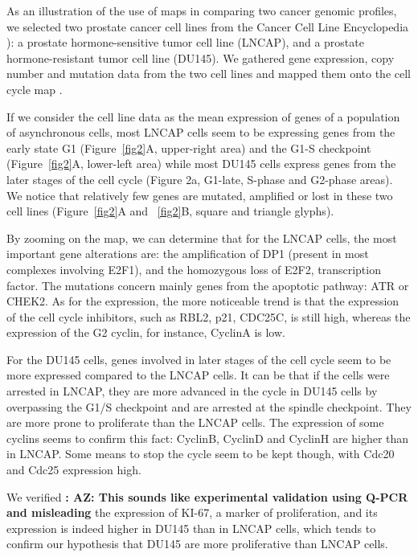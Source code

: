 \documentclass[a4,center,fleqn]{NAR}
\begin{document}
As an illustration of the use of maps in comparing two cancer genomic profiles, we
selected two prostate cancer cell lines from the Cancer Cell Line Encyclopedia
\cite{barretina2012cancer}): a prostate hormone-sensitive
tumor cell line (LNCAP), and a prostate hormone-resistant tumor cell line
(DU145). We gathered gene expression, copy number and mutation data from
the two cell lines and mapped them onto the cell cycle map
\cite{calzone2008comprehensive}.

If we consider the cell line data as the mean expression of genes of a
population of asynchronous cells, most LNCAP cells seem to be expressing genes
from the early state G1 (Figure~\ref{fig2}A, upper-right area) and the G1-S checkpoint
(Figure~\ref{fig2}A, lower-left area) while most DU145 cells express genes from the
later stages of the cell cycle (Figure 2a, G1-late, S-phase and G2-phase
areas).  We notice that relatively few genes are mutated, amplified or lost
in these two cell lines (Figure~\ref{fig2}A and ~\ref{fig2}B, square and triangle glyphs).

By zooming on the map, we can determine that for the LNCAP cells, the most
important gene alterations are: the amplification of DP1 (present in most
complexes involving E2F1), and the homozygous loss of E2F2, transcription
factor. The mutations concern mainly genes from the apoptotic pathway: ATR or
CHEK2. As for the expression, the more noticeable trend is that the expression
of the cell cycle inhibitors, such as RBL2, p21, CDC25C, is still high, whereas
the expression of the G2 cyclin, for instance, CyclinA is low.

For the DU145 cells, genes involved in later stages of the cell cycle seem to
be more expressed compared to the LNCAP cells. It can be that if the cells were
arrested in LNCAP, they are more advanced in the cycle in DU145 cells by
overpassing the G1/S checkpoint and are arrested at the spindle checkpoint.
They are more prone to proliferate than the LNCAP cells. The expression of some
cyclins seems to confirm this fact: CyclinB, CyclinD and CyclinH are higher
than in LNCAP. Some means to stop the cycle seem to be kept though, with Cdc20
and Cdc25 expression high.

We verified {\bf: AZ: This sounds like experimental validation using Q-PCR and misleading} 
the expression of KI-67, a marker of proliferation, and its
expression is indeed higher in DU145 than in LNCAP cells, which tends to
confirm our hypothesis that DU145 are more proliferative than LNCAP cells.
\end{document}
